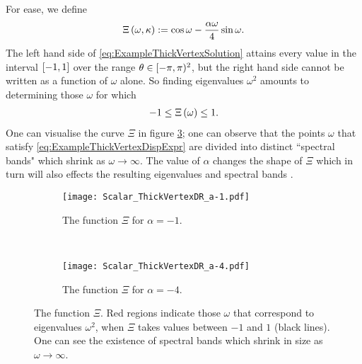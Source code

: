 For ease, we define
\begin{align*}
	\Xi\left( \omega, \kappa \right) := \cos\omega - \frac{\alpha\omega}{4}\sin\omega.
\end{align*}
The left hand side of \eqref{eq:ExampleThickVertexSolution} attains every value in the interval $\left[ -1,1 \right]$ over the range $\theta\in[-\pi,\pi)^2$, but the right hand side cannot be written as a function of $\omega$ alone.
So finding eigenvalues $\omega^2$ amounts to determining those $\omega$ for which
\begin{align} \label{eq:ExampleThickVertexDispExpr}
	-1 \leq \Xi\left( \omega \right) \leq 1.
\end{align}
One can visualise the curve $\Xi$ in figure \ref{fig:Scalar_ThickVertexDR}; one can observe that the points $\omega$ that satisfy \eqref{eq:ExampleThickVertexDispExpr} are divided into distinct ``spectral bands" which shrink as $\omega\rightarrow\infty$.
The value of $\alpha$ changes the shape of $\Xi$ which in turn will also effects the resulting eigenvalues and spectral bands .
\begin{figure}[t]
	\centering
	\begin{subfigure}[t]{0.45\textwidth}
		\centering
		\texttt{[image: Scalar\_ThickVertexDR\_a-1.pdf]}
		\caption{\label{fig:Scalar_ThickVertexDR_a-1} The function $\Xi$ for $\alpha=-1$.}
	\end{subfigure}
	~
	\begin{subfigure}[t]{0.45\textwidth}
		\centering
		\texttt{[image: Scalar\_ThickVertexDR\_a-4.pdf]}
		\caption{\label{fig:Scalar_ThickVertexDR_a-4} The function $\Xi$ for $\alpha=-4$.}
	\end{subfigure}
	\caption{\label{fig:Scalar_ThickVertexDR} The function $\Xi$. Red regions indicate those $\omega$ that correspond to eigenvalues $\omega^2$, when $\Xi$ takes values between $-1$ and $1$ (black lines). One can see the existence of spectral bands which shrink in size as $\omega\rightarrow\infty$.}
\end{figure}
